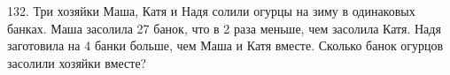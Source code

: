 132. Три хозяйки Маша, Катя и Надя солили огурцы на зиму в одинаковых банках. Маша засолила 27 банок, что в 2 раза меньше, чем засолила Катя. Надя заготовила на 4 банки больше, чем Маша и Катя вместе. Сколько банок огурцов засолили хозяйки вместе?\\

